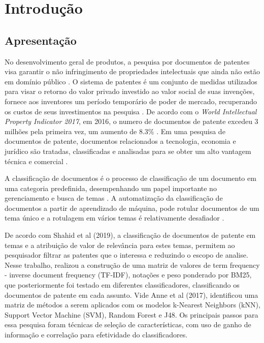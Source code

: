 
\chapter[Introdução]{Introdução}


\section{Apresentação}	

No desenvolvimento geral de produtos, a pesquisa por documentos de patentes visa garantir o não infringimento de propriedades intelectuais que ainda não estão em domínio público \cite{Breitzman2002}.  O sistema de patentes é um conjunto de medidas utilizados para visar o retorno do valor privado investido ao valor social de suas invenções, fornece aos inventores um período temporário de poder de mercado, recuperando os custos de seus investimentos na pesquisa \cite{Williams2017}. De acordo com o \textit{World Intellectual Property Indicator 2017}, em 2016, o numero de documentos de patente excedeu 3 milhões pela primeira vez, um aumento de 8.3\% \cite{Li2018}. Em uma pesquisa de documentos de patente, documentos relacionados a tecnologia, economia e jurídico são tratadas, classificadas e analisadas para se obter um alto vantagem técnica e comercial \cite{Li2018}.

A classificação de documentos é o processo de classificação de um documento em uma categoria predefinida, desempenhando um papel importante no gerenciamento e busca de temas \cite{Anne2017}. A automatização da classificação de documentos a partir de aprendizado de máquina, pode rotular documentos de um tema único e a rotulagem em vários temas é relativamente desafiador \cite{Anne2017}.

De acordo com Shahid et al (2019), a classificação de documentos de patente em temas e a atribuição de valor de relevância para estes temas, permitem ao pesquisador filtrar as patentes que o interessa e reduzindo o escopo de analise. Nesse trabalho, realizou a construção de uma matriz de valores de term frequency - inverse document frequency (TF-IDF), notações e peso ponderado por BM25, que posteriormente foi testado em diferentes classificadores, classificando os documentos de patente em cada assunto.
Vide Anne et al (2017), identificou uma matriz de métodos a serem aplicados com os modelos k-Nearest Neighbors (kNN),  Support Vector Machine (SVM), Random Forest e J48. Os principais passos para essa pesquisa foram técnicas de seleção de características, com uso de ganho de informação e correlação para efetividade do classificadores.

